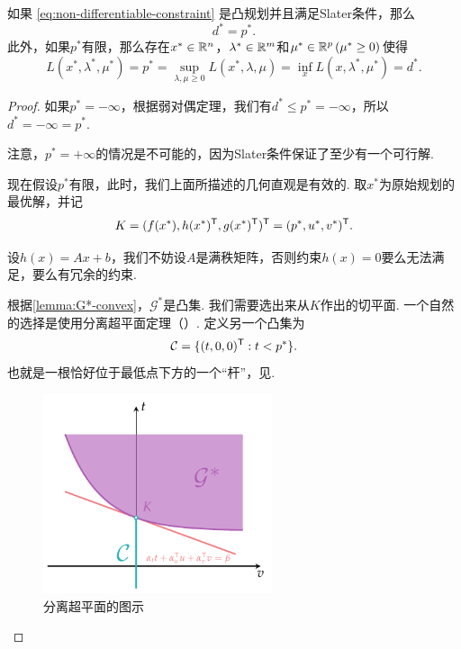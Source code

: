 \begin{theorem}[强对偶定理]
    如果 \eqref{eq:non-differentiable-constraint} 是凸规划并且满足Slater条件，那么
    \[d^*=p^*.\]
    此外，如果$p^*$有限，那么存在$x^*\in\mathbb{R}^n$，$\lambda^*\in\mathbb{R}^m$和$\mu^*\in\mathbb{R}^p\,(\mu^*\geq 0)$使得
    \begin{equation}
        L(x^*,\lambda^*,\mu^*)=p^*=\sup_{\lambda,\mu\geq 0} L(x^*,\lambda,\mu)=\inf_{x} L(x,\lambda^*,\mu^*)=d^*.\label{eq:strong-duality-solution}
    \end{equation}
\end{theorem}
\begin{proof}
    如果$p^*=-\infty$，根据弱对偶定理，我们有$d^*\leq p^*=-\infty$，所以$d^*=-\infty=p^*$.

    注意，$p^*=+\infty$的情况是不可能的，因为Slater条件保证了至少有一个可行解. 
    
    现在假设$p^*$有限，此时，我们上面所描述的几何直观是有效的. 取$x^*$为原始规划的最优解，并记
    \[K=(f(x^*),h(x^*)^{\mathsf{T}},g(x^*)^{\mathsf{T}})^{\mathsf{T}}=(p^*,u^*,v^*)^{\mathsf{T}}.\]

    设$h(x)=Ax+b$，我们不妨设$A$是满秩矩阵，否则约束$h(x)=0$要么无法满足，要么有冗余的约束.

    根据\cref{lemma:G*-convex}，$\mathcal G^*$是凸集. 我们需要选出来从$K$作出的切平面. 一个自然的选择是使用分离超平面定理（）. 定义另一个凸集为
    \[\mathcal{C}=\{(t,0,0)^{\mathsf{T}}: t<p^*\}.\]
    也就是一根恰好位于最低点下方的一个“杆”，见.

    \begin{figure}[ht]
        \centering
        \includegraphics[width=0.6\textwidth]{figures/duality/duality-proof-strong-dual.pdf}
        \caption{分离超平面的图示}
        \label{fig:duality-proof-strong-dual}
    \end{figure}


\end{proof}
